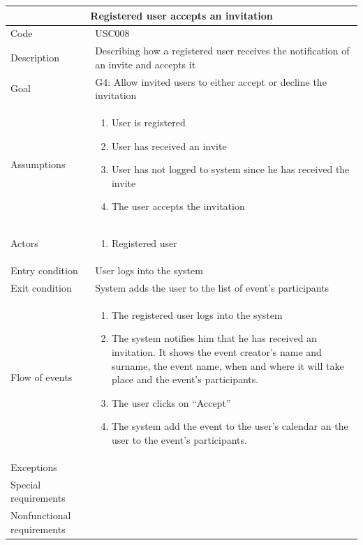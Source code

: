 \documentclass[10pt,a4paper,titlepage]{article}
\begin{document}
\begin{tabular}[h]{| p{3cm} | p{10cm} |}
\hline \multicolumn{2}{|c|}{\textbf{ Registered user accepts an invitation }} \\ 
\hline Code & USC008 \\ 
\hline Description & Describing how a registered user receives the notification of an invite and accepts it \\
\hline Goal & G4: Allow invited users to either accept or decline the invitation \\
\hline Assumptions  & \begin{enumerate}
\item User is registered
\item User has received an invite
\item User has not logged to system since he has received the invite
\item The user accepts the invitation
\end{enumerate} \\
\hline Actors &  \begin{enumerate}
\item Registered user
\end{enumerate} \\
\hline Entry condition & User logs into the system \\
\hline Exit condition & System adds the user to the list of event’s participants\\
\hline Flow of events & \begin{enumerate}
\item The registered user logs into the system
\item The system notifies him that he has received an invitation. It shows the event creator’s name and surname, the event name, when and where it will take place and the event’s participants.
\item The user clicks on “Accept”
\item The system add the event to the user’s calendar an the user to the event’s participants.
\end{enumerate}\\
\hline Exceptions & \\
\hline Special requirements & \\
\hline Nonfunctional requirements & \\
\hline
\end{tabular}
\end{document}
